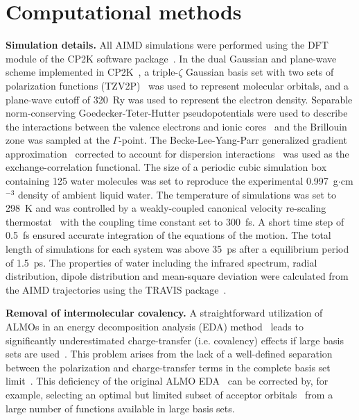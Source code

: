 \documentclass[aps,prl,reprint,amsmath,amssymb]{revtex4-1}
\begin{document}
\section{Computational methods}

\textbf{Simulation details.} All AIMD simulations were performed using the DFT module of the CP2K software package~\cite{www:cp2k}. 
In the dual Gaussian and plane-wave scheme implemented in CP2K~\cite{hutter2014cp2k}, a triple-$\zeta$ Gaussian basis set with two sets of polarization functions (TZV2P)~\cite{vandevondele2007gaussian} was used to represent molecular orbitals, and a plane-wave cutoff of 320~Ry was used to represent the electron density. 
Separable norm-conserving Goedecker-Teter-Hutter pseudopotentials were used to describe the interactions between the valence electrons and ionic cores~\cite{goedecker1996separable,krack2005pseudopotentials} and the Brillouin zone was sampled at the $\Gamma$-point. 
The Becke-Lee-Yang-Parr generalized gradient approximation~\cite{becke1988density, lee1988development} corrected to account for dispersion interactions~\cite{grimme2010consistent} was used as the exchange-correlation functional. 
The size of a periodic cubic simulation box containing 125 water molecules was set to reproduce the experimental 0.997~g$\cdot$cm$^{-3}$ density of ambient liquid water. 
The temperature of simulations was set to 298~K and was controlled by a weakly-coupled canonical velocity re-scaling thermostat~\cite{bussi2007canonical} with the coupling time constant set to 300~fs. 
A short time step of 0.5~fs ensured accurate integration of the equations of the motion. 
The total length of simulations for each system was above 35~ps after a equilibrium period of 1.5~ps. 
The properties of water including the infrared spectrum, radial distribution, dipole distribution and mean-square deviation were calculated from the AIMD trajectories using the TRAVIS package~\cite{brehm2012travis}.  

\textbf{Removal of intermolecular covalency.} A straightforward utilization of ALMOs in an energy decomposition analysis (EDA) method~\cite{khaliullin2007unravelling} leads to significantly underestimated charge-transfer (i.e. covalency) effects if large basis sets are used~\cite{horn2015polarization,herbert2016}. 
This problem arises from the lack of a well-defined separation between the polarization and charge-transfer terms in the complete basis set limit~\cite{misquitta2013charge,horn2015polarization}. 
This deficiency of the original ALMO EDA~\cite{khaliullin2007unravelling} can be corrected by, for example, selecting an optimal but limited subset of acceptor orbitals~\cite{horn2015polarization} from a large number of functions available in large basis sets. 
\end{document}
